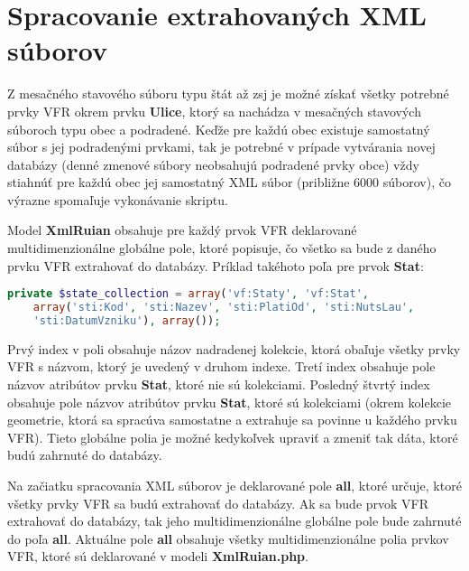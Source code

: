 \section{Spracovanie extrahovaných XML súborov}
Z mesačného stavového súboru typu štát až zsj je možné získať všetky potrebné prvky VFR okrem prvku {\bf Ulice}, ktorý sa nachádza v mesačných stavových súboroch typu obec a podradené. Keďže pre každú obec existuje samostatný súbor s jej podradenými prvkami, tak je potrebné v prípade vytvárania novej databázy (denné zmenové súbory neobsahujú podradené prvky obce) vždy stiahnúť pre každú obec jej samostatný XML súbor (približne 6000 súborov), čo výrazne spomaľuje vykonávanie skriptu.

Model {\bf XmlRuian} obsahuje pre každý prvok VFR deklarované multidimenzionálne globálne pole, ktoré popisuje, čo všetko sa bude z daného prvku VFR extrahovať do databázy. Príklad takéhoto poľa pre prvok {\bf Stat}:
\begin{lstlisting}[language=PHP]
	private $state_collection = array('vf:Staty', 'vf:Stat', 
	array('sti:Kod', 'sti:Nazev', 'sti:PlatiOd', 'sti:NutsLau',
	'sti:DatumVzniku'), array());
\end{lstlisting}
Prvý index v poli obsahuje názov nadradenej kolekcie, ktorá obaľuje všetky prvky VFR s názvom, ktorý je uvedený v druhom indexe. Tretí index obsahuje pole názvov atribútov prvku {\bf Stat}, ktoré nie sú kolekciami. Posledný štvrtý index obsahuje pole názvov atribútov prvku {\bf Stat}, ktoré sú kolekciami (okrem kolekcie geometrie, ktorá sa spracúva samostatne a extrahuje sa povinne u každého prvku VFR). Tieto globálne polia je možné kedykoľvek upraviť a zmeniť tak dáta, ktoré budú zahrnuté do databázy.

Na začiatku spracovania XML súborov je deklarované pole {\bf all}, ktoré určuje, ktoré všetky prvky VFR sa budú extrahovať do databázy. Ak sa bude prvok VFR extrahovať do databázy, tak jeho multidimenzionálne globálne pole bude zahrnuté
do poľa {\bf all}. Aktuálne pole {\bf all} obsahuje všetky multidimenzionálne polia prvkov VFR, ktoré sú deklarované v modeli {\bf XmlRuian.php}.

